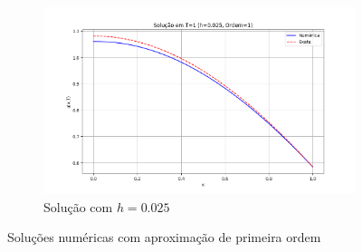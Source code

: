 \documentclass[column,amsmath,amssymb,floatfix]{revtex4}
\begin{document}
\begin{figure}[H]
\begin{subfigure}{0.35\textwidth}
     \includegraphics[width=\textwidth]{img/ex0103.png}
     \caption{Solução com $h=0.025$}
     \label{fig:ex1_3}
 \end{subfigure}
 \caption{Soluções numéricas com aproximação de primeira ordem}
 \label{fig:ex1_ord1}
\end{figure}
\end{document}
